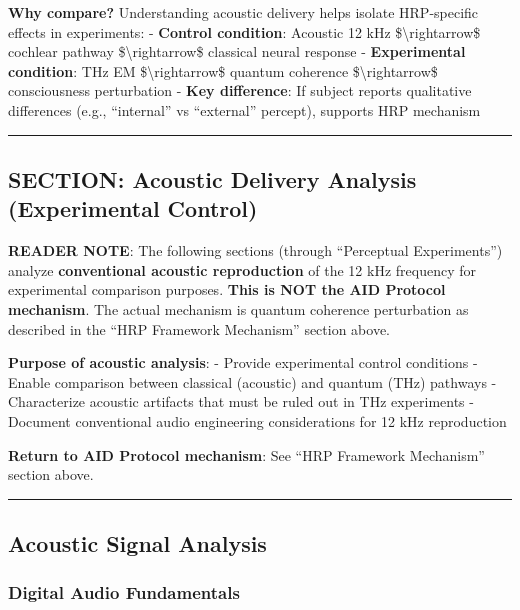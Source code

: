 \textbf{Why compare?} Understanding acoustic delivery helps isolate
HRP-specific effects in experiments: - \textbf{Control condition}:
Acoustic 12 kHz \$\textbackslash rightarrow\$ cochlear pathway
\$\textbackslash rightarrow\$ classical neural response -
\textbf{Experimental condition}: THz EM \$\textbackslash rightarrow\$
quantum coherence \$\textbackslash rightarrow\$ consciousness
perturbation - \textbf{Key difference}: If subject reports qualitative
differences (e.g., ``internal'' vs ``external'' percept), supports HRP
mechanism

\begin{center}\rule{0.5\linewidth}{0.5pt}\end{center}

\subsection{SECTION: Acoustic Delivery Analysis (Experimental
Control)}\label{section-acoustic-delivery-analysis-experimental-control}

\textbf{ READER NOTE}: The following sections (through ``Perceptual
Experiments'') analyze \textbf{conventional acoustic reproduction} of
the 12 kHz frequency for experimental comparison purposes. \textbf{This
is NOT the AID Protocol mechanism}. The actual mechanism is quantum
coherence perturbation as described in the ``HRP Framework Mechanism''
section above.

\textbf{Purpose of acoustic analysis}: - Provide experimental control
conditions - Enable comparison between classical (acoustic) and quantum
(THz) pathways - Characterize acoustic artifacts that must be ruled out
in THz experiments - Document conventional audio engineering
considerations for 12 kHz reproduction

\textbf{Return to AID Protocol mechanism}: See ``HRP Framework
Mechanism'' section above.

\begin{center}\rule{0.5\linewidth}{0.5pt}\end{center}

\subsection{Acoustic Signal Analysis}\label{acoustic-signal-analysis}

\subsubsection{Digital Audio
Fundamentals}\label{digital-audio-fundamentals}

